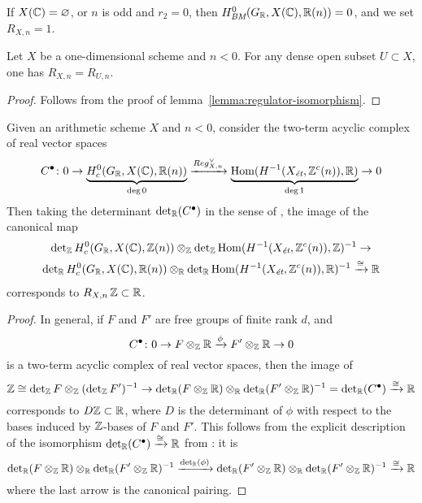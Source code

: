 \documentclass{article}
\numberwithin{equation}{section}
\begin{document}
If $X (\CC) = \emptyset$, or $n$ is odd and $r_2 = 0$, then
$H^0_\BM (G_\RR, X(\CC), \RR (n)) = 0$, and we set $R_{X,n} = 1$.

\begin{lemma}
  \label{lemma:regulator-dense-open-subset}
  Let $X$ be a one-dimensional scheme and $n < 0$. For any dense open subset
  $U \subset X$, one has $R_{X,n} = R_{U,n}$.

  \begin{proof}
    Follows from the proof of lemma~\ref{lemma:regulator-isomorphism}.
  \end{proof}
\end{lemma}

\begin{proposition}
  \label{prop:trivialization-of-free-part}
  Given an arithmetic scheme $X$ and $n < 0$, consider the two-term acyclic
  complex of real vector spaces
  \[ C^\bullet\colon
    0 \to
    \underbrace{H^0_c (G_\RR, X(\CC), \RR(n))}_{\deg 0}
    \xrightarrow{Reg_{X,n}^\vee}
    \underbrace{\Hom (H^{-1} (X_\et, \ZZ^c (n)), \RR)}_{\deg 1}
    \to 0 \]
  Then taking the determinant $\det_\RR (C^\bullet)$ in the sense of
  \cite{Knudsen-Mumford-1976}, the image of the canonical map
  \begin{multline*}
    \det_\ZZ H^0_c (G_\RR, X(\CC), \ZZ(n)) \otimes_\ZZ
    \det_\ZZ \Hom (H^{-1} (X_\et, \ZZ^c (n)), \ZZ)^{-1} \to \\
    \det_\RR H^0_c (G_\RR, X(\CC), \RR (n)) \otimes_\RR
    \det_\RR \Hom (H^{-1} (X_\et, \ZZ^c (n)), \RR)^{-1}
    \xrightarrow{\cong} \RR
  \end{multline*}
  corresponds to $R_{X,n}\,\ZZ \subset \RR$.

  \begin{proof}
    In general, if $F$ and $F'$ are free groups of finite rank $d$, and
    $$C^\bullet\colon 0 \to F\otimes_\ZZ \RR \xrightarrow{\phi} F'\otimes_\ZZ \RR \to 0$$
    is a two-term acyclic complex of real vector spaces, then the image of
    \[ \ZZ \cong \det_\ZZ F \otimes_\ZZ (\det_\ZZ F')^{-1} \to
      \det_\RR (F\otimes_\ZZ \RR) \otimes_\RR \det_\RR (F' \otimes_\ZZ \RR)^{-1}
      = \det_\RR (C^\bullet) \xrightarrow{\cong} \RR \]
    corresponds to $D\ZZ \subset \RR$, where $D$ is the determinant of $\phi$ with
    respect to the bases induced by $\ZZ$-bases of $F$ and $F'$.
    This follows from the explicit description of the isomorphism
    $\det_\RR (C^\bullet) \xrightarrow{\cong} \RR$ from
    \cite[p.\,33]{Knudsen-Mumford-1976}: it is
    \[ \det_\RR (F \otimes_\ZZ \RR) \otimes_\RR
      \det_\RR (F'\otimes_\ZZ \RR)^{-1} \xrightarrow{\det_\RR (\phi)}
      \det_\RR (F' \otimes_\ZZ \RR) \otimes_\RR
      \det_\RR (F' \otimes_\ZZ \RR)^{-1} \xrightarrow{\cong} \RR \]
    where the last arrow is the canonical pairing.


\end{proof}
\end{proposition}
\end{document}
